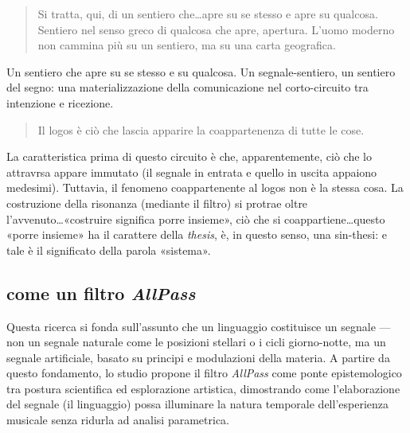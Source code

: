 \begin{quote}
  \begin{sf}
    \small
    Si tratta, qui, di un sentiero che\ldots apre su se stesso e apre su
    qualcosa. Sentiero nel senso greco di qualcosa che apre, apertura. L'uomo
    moderno non cammina più su un sentiero, ma su una carta geografica.
  \end{sf}
\end{quote}

Un sentiero che apre su se stesso e su qualcosa. Un segnale-sentiero, un sentiero
del segno: una materializzazione della comunicazione nel corto-circuito tra
intenzione e ricezione.

\begin{quote}
  \begin{sf}
    \small
    Il logos è ciò che lascia apparire la coappartenenza di tutte le cose.
  \end{sf}
\end{quote}

La caratteristica prima di questo circuito è che, apparentemente, ciò che lo
attravrsa appare immutato (il segnale in entrata e quello in uscita appaiono
medesimi). Tuttavia, il fenomeno coappartenente al logos non è la stessa cosa.
La costruzione della risonanza (mediante il filtro) si protrae oltre
l'avvenuto\ldots «costruire significa porre insieme», ciò che si
coappartiene\ldots questo «porre insieme» ha il carattere della \emph{thesis},
è, in questo senso, una sin-thesi: e tale è il significato della parola «sistema».


\subsection{come un filtro \emph{AllPass}}

Questa ricerca si fonda sull'assunto che un linguaggio costituisce un segnale — non un segnale naturale come le posizioni stellari o i cicli giorno-notte, ma un segnale artificiale, basato su principi e modulazioni della materia. A partire da questo fondamento, lo studio propone il filtro \emph{AllPass} come ponte epistemologico tra postura scientifica ed esplorazione artistica, dimostrando come l'elaborazione del segnale (il linguaggio) possa illuminare la natura temporale dell'esperienza musicale senza ridurla ad analisi parametrica.


